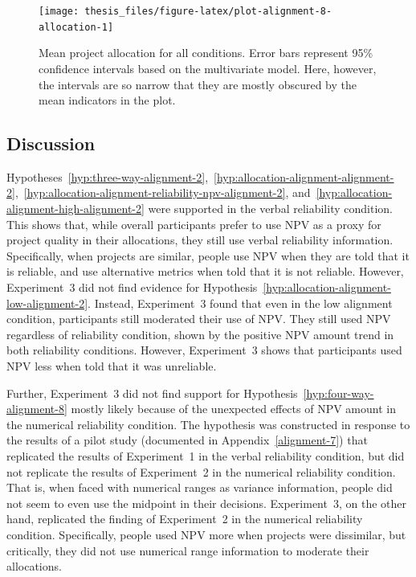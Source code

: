 \documentclass[a4paper, nobind, dvipsnames]{templates/ociamthesis}
\theoremstyle{definition}
\theoremstyle{definition}
\theoremstyle{definition}
\theoremstyle{definition}
\theoremstyle{remark}
\begin{document}
\begin{figure}
\texttt{[image: thesis\_files/figure-latex/plot-alignment-8-allocation-1]} \caption{Mean project allocation for all conditions. Error bars represent 95\% confidence intervals based on the multivariate model. Here, however, the intervals are so narrow that they are mostly obscured by the mean indicators in the plot.}\label{fig:plot-alignment-8-allocation}
\end{figure}

\subsection{Discussion}

Hypotheses~\ref{hyp:three-way-alignment-2},~\ref{hyp:allocation-alignment-alignment-2},~\ref{hyp:allocation-alignment-reliability-npv-alignment-2},
and~\ref{hyp:allocation-alignment-high-alignment-2} were supported in the
verbal reliability condition. This shows that, while overall participants prefer
to use NPV as a proxy for project quality in their allocations, they still use
verbal reliability information. Specifically, when projects are similar, people
use NPV when they are told that it is reliable, and use alternative metrics when
told that it is not reliable. However, Experiment~3 did not find evidence for
Hypothesis~\ref{hyp:allocation-alignment-low-alignment-2}. Instead,
Experiment~3 found that even in the low alignment condition, participants still
moderated their use of NPV. They still used NPV regardless of reliability
condition, shown by the positive NPV amount trend in both reliability
conditions. However, Experiment~3 shows that participants used NPV less when
told that it was unreliable.

Further, Experiment~3 did not find support for
Hypothesis~\ref{hyp:four-way-alignment-8} mostly likely because of the
unexpected effects of NPV amount in the numerical reliability condition. The
hypothesis was constructed in response to the results of a pilot study
(documented in Appendix~\ref{alignment-7}) that replicated the results of
Experiment~1 in the verbal reliability condition, but did not replicate the
results of Experiment~2 in the numerical reliability condition. That is, when
faced with numerical ranges as variance information, people did not seem to even
use the midpoint in their decisions. Experiment~3, on the other hand, replicated
the finding of Experiment~2 in the numerical reliability condition.
Specifically, people used NPV more when projects were dissimilar, but
critically, they did not use numerical range information to moderate their
allocations.
\end{document}
